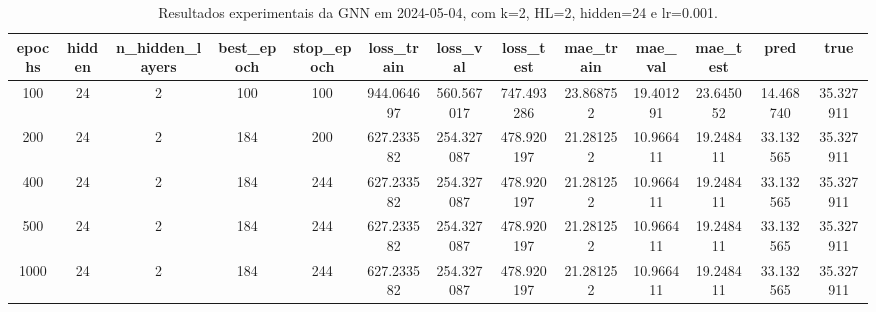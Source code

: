\begin{table}[h]
\centering
\caption{Resultados experimentais da GNN em 2024-05-04, com k=2, HL=2, hidden=24 e lr=0.001.}
\label{tab:gnn_results_k2_hl2_h24_d20240504}
\begin{tabular}{ccccccccccccc}
\toprule
epochs & hidden & n\_hidden\_layers & best\_epoch & stop\_epoch & loss\_train & loss\_val & loss\_test & mae\_train & mae\_val & mae\_test & pred & true \\
\midrule
100 & 24 & 2 & 100 & 100 & 944.064697 & 560.567017 & 747.493286 & 23.868752 & 19.401291 & 23.645052 & 14.468740 & 35.327911 \\
200 & 24 & 2 & 184 & 200 & 627.233582 & 254.327087 & 478.920197 & 21.281252 & 10.966411 & 19.248411 & 33.132565 & 35.327911 \\
400 & 24 & 2 & 184 & 244 & 627.233582 & 254.327087 & 478.920197 & 21.281252 & 10.966411 & 19.248411 & 33.132565 & 35.327911 \\
500 & 24 & 2 & 184 & 244 & 627.233582 & 254.327087 & 478.920197 & 21.281252 & 10.966411 & 19.248411 & 33.132565 & 35.327911 \\
1000 & 24 & 2 & 184 & 244 & 627.233582 & 254.327087 & 478.920197 & 21.281252 & 10.966411 & 19.248411 & 33.132565 & 35.327911 \\
\bottomrule
\end{tabular}
\end{table}
